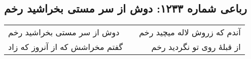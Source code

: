 \begin{center}
\section*{رباعی شماره ۱۲۳۳: دوش از سر مستی بخراشید رخم}
\label{sec:1233}
\begin{longtable}{l p{0.5cm} r}
دوش از سر مستی بخراشید رخم
&&
آندم که زروش لاله میچید رخم
\\
گفتم مخراشش که از آنروز که زاد
&&
از قبلهٔ روی تو نگردید رخم
\\
\end{longtable}
\end{center}
